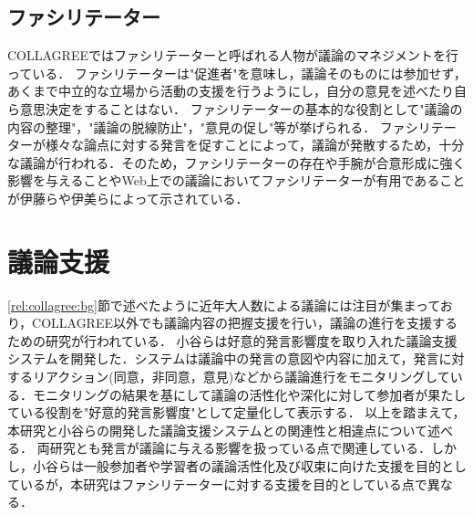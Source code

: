 \subsection{ファシリテーター}
COLLAGREEではファシリテーターと呼ばれる人物が議論のマネジメントを行っている．
ファシリテーターは"促進者"を意味し，議論そのものには参加せず，あくまで中立的な立場から活動の支援を行うようにし，自分の意見を述べたり自ら意思決定をすることはない．
ファシリテーターの基本的な役割として"議論の内容の整理"，"議論の脱線防止"，"意見の促し"等が挙げられる．
ファシリテーターが様々な論点に対する発言を促すことによって，議論が発散するため，十分な議論が行われる．そのため，ファシリテーターの存在や手腕が合意形成に強く影響を与えることやWeb上での議論においてファシリテーターが有用であることが伊藤ら\cite{facilitation}や伊美ら\cite{collagree_Experiment}によって示されている．

\section{議論支援}
\label{rel:argSupport}
\ref{rel:collagree:bg}節で述べたように近年大人数による議論には注目が集まっており，COLLAGREE以外でも議論内容の把握支援を行い，議論の進行を支援するための研究が行われている．
小谷ら\cite{discSupport2}は好意的発言影響度を取り入れた議論支援システムを開発した．システムは議論中の発言の意図や内容に加えて，発言に対するリアクション(同意，非同意，意見)などから議論進行をモニタリングしている．モニタリングの結果を基にして議論の活性化や深化に対して参加者が果たしている役割を"好意的発言影響度"として定量化して表示する．
以上を踏まえて，本研究と小谷らの開発した議論支援システムとの関連性と相違点について述べる．
両研究とも発言が議論に与える影響を扱っている点で関連している．しかし，小谷らは一般参加者や学習者の議論活性化及び収束に向けた支援を目的としているが，本研究はファシリテーターに対する支援を目的としている点で異なる．
